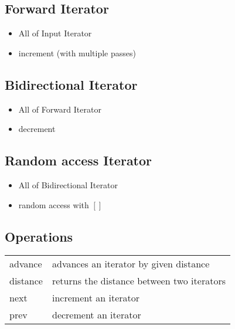 \subsection{Forward Iterator}
\begin{itemize}
	\item All of Input Iterator
	\item increment (with multiple passes)
\end{itemize}

\subsection{Bidirectional Iterator}
\begin{itemize}
	\item All of Forward Iterator
	\item decrement
\end{itemize}

\subsection{Random access Iterator}
\begin{itemize}
	\item All of Bidirectional Iterator
	\item random access with $[]$
\end{itemize}

\subsection{Operations}
\begin{tabular}{ll}
	advance  & advances an iterator by given distance \\
	distance & returns the distance between two iterators \\
	next     & increment an iterator \\
	prev     & decrement an iterator \\
\end{tabular}

